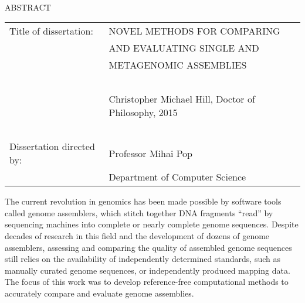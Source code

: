 
\hbox{\ }

\renewcommand{\baselinestretch}{1}
\small \normalsize

\begin{center}
\large{{ABSTRACT}}

\vspace{3em}

\end{center}
\hspace{-.15in}
\begin{tabular}{ll}
Title of dissertation:    & {\large  NOVEL METHODS FOR COMPARING}\\
&				      {\large AND EVALUATING SINGLE AND  } \\
&                     {\large METAGENOMIC ASSEMBLIES} \\
\ \\
&                          {\large  Christopher Michael Hill, Doctor of Philosophy, 2015} \\
\ \\
Dissertation directed by: & {\large  Professor Mihai Pop} \\
&  				{\large	 Department of Computer Science } \\
\end{tabular}

\vspace{3em}

\renewcommand{\baselinestretch}{2}
\large \normalsize


The current revolution in genomics has been made possible by software tools called genome assemblers, which stitch together DNA fragments ``read'' by sequencing machines into complete or nearly complete genome sequences. Despite decades of research in this field and the development of dozens of genome assemblers, assessing and comparing the quality of assembled genome sequences still relies on the availability of independently determined standards, such as manually curated genome sequences, or independently produced mapping data. The focus of this work was to develop reference-free computational methods to accurately compare and evaluate genome assemblies.

